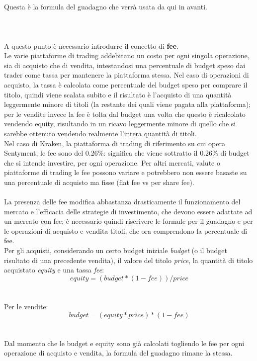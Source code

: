 \documentclass[a4paper,12pt]{report}
\begin{document}
\\~\\
Questa è la formula del guadagno che verrà usata da qui in avanti.		
\\~\\\\~\\
A questo punto è necessario introdurre il concetto di \textbf{fee}.\\
Le varie piattaforme di trading addebitano un costo per ogni singola operazione, sia di acquisto che di vendita, intestandosi una percentuale di budget speso dai trader come tassa per mantenere la piattaforma stessa. Nel caso di operazioni di acquisto, la tassa è calcolata come percentuale del budget speso per comprare il titolo, quindi viene scalata subito e il risultato è l'acquisto di una quantità leggermente minore di titoli (la restante dei quali viene pagata alla piattaforma); per le vendite invece la fee è tolta dal budget una volta che questo è ricalcolato vendendo equity, risultando in un ricavo leggermente minore di quello che si sarebbe ottenuto vendendo realmente l'intera quantità di titoli.\\
Nel caso di Kraken, la piattaforma di trading di riferimento su cui opera Sentyment, le fee sono del 0.26\%: significa che viene sottratto il 0.26\% di budget che si intende investire, per ogni operazione. Per altri mercati, valute o piattaforme di trading le fee possono variare e potrebbero non essere basaste su una percentuale di acquisto ma fisse (flat fee vs per share fee).
\\~\\
La presenza delle fee modifica abbastanza drasticamente il funzionamento del mercato e l'efficacia delle strategie di investimento, che devono essere adattate ad un mercato con fee; è necessario quindi riscrivere le formule per il guadagno e per le operazioni di acquisto e vendita titoli, che ora comprendono la percentuale di fee.\\
Per gli acquisti, considerando un certo budget iniziale \textit{budget} (o il budget risultato di una precedente vendita), il valore del titolo \textit{price}, la quantità di titolo acquistato \textit{equity} e una tassa \textit{fee}:\\
\begin{equation}
equity=(budget*(1-fee))/price
\end{equation}
\\~\\
Per le vendite:\\
\begin{equation}
budget=(equity*price)*(1-fee)
\end{equation}
\\~\\
Dal momento che le budget e equity sono già calcolati togliendo le fee per ogni operazione di acquisto e vendita, la formula del guadagno rimane la stessa.\\~\\
\end{document}
